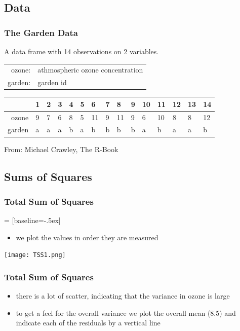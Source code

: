 \subsection{Data}
\begin{frame}[fragile]\frametitle{The Garden Data}
A data frame with 14 observations on 2 variables. 
\begin{center}
\begin{tabular}{@{} >{\ttfamily}r l}
  ozone: & athmospheric ozone concentration               \\
  garden: & garden id                              \\
\end{tabular}

\vspace*{1cm}

\begin{table}[ht]
\small
\centering
\begin{tabular}{rllllllllllllll}
  \hline
 & 1 & 2 & 3 & 4 & 5 & 6 & 7 & 8 & 9 & 10 & 11 & 12 & 13 & 14 \\ 
  \hline
ozone &  9 &  7 &  6 &  8 &  5 & 11 &  9 & 11 &  9 &  6 & 10 &  8 &  8 & 12 \\ 
  garden & a & a & a & b & a & b & b & b & b & a & b & a & a & b \\ 
   \hline
\end{tabular}
\end{table}
\end{center}
From: Michael Crawley, The R-Book

\end{frame}

\subsection{Sums of Squares}
\begin{frame}\frametitle{Total Sum of Squares}
 = [baseline=-.5ex]
  \begin{itemize}
  \item  we plot the values in order they are measured
  \end{itemize}
\begin{center}
\texttt{[image: TSS1.png]}
\end{center}
\end{frame}

\begin{frame}\frametitle{Total Sum of Squares}
  \begin{itemize}
  \item  there is a lot of scatter, indicating that the variance in ozone is large
  \item to get a feel for the overall variance we plot the overall mean (8.5) and indicate each of the residuals by a vertical line
  \end{itemize}
\end{frame}

